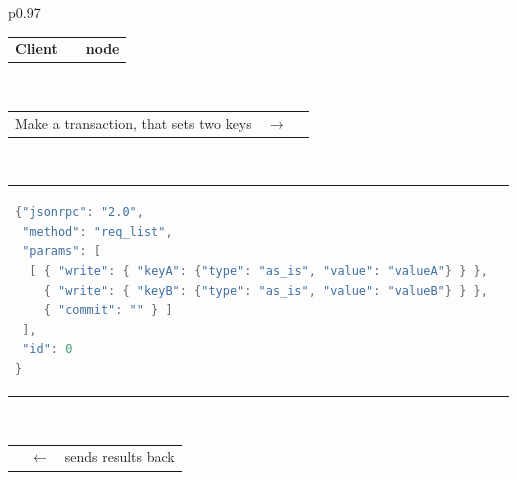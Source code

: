 \documentclass[a4paper]{scrreprt}
\begin{document}
\begin{longtable}{p{}}
\begin{tabular}{p{}cp{}}
\bf Client & & \hfill\bf \scalaris{} node \\
\end{tabular} \\
%
\begin{tabular}{p{}cp{}}
Make a transaction, that sets two keys & $\to$ & \\
\end{tabular}\vspace{-1.5em} \\
%
\begin{tabular}{p{}p{}}
\vspace{-1.5em}%
\begin{lstlisting}[language=java]
{"jsonrpc": "2.0",
 "method": "req_list",
 "params": [
  [ { "write": { "keyA": {"type": "as_is", "value": "valueA"} } },
    { "write": { "keyB": {"type": "as_is", "value": "valueB"} } },
    { "commit": "" } ]
 ],
 "id": 0
}
\end{lstlisting}
& \\
\end{tabular}\vspace{-1em} \\
%
\begin{tabular}{p{}cp{}}
 & $\leftarrow$ & \hfill{}\scalaris{} sends results back \\
\end{tabular}\vspace{-1.5em} \\


\end{longtable}
\end{document}
